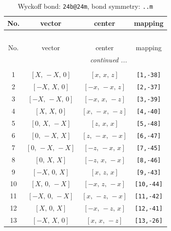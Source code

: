 \documentclass[fleqn,8pt]{jsarticle}
\begin{document}
\begin{longtable}{cccc}
\caption{Wyckoff bond: {\tt 24b@24m}, bond symmetry: {\tt ..m}}
 \\
 \hline \hline
No. & vector & center & mapping \\ \hline \endfirsthead

\multicolumn{3}{l}{\tablename\ \thetable{}} \\
 \hline \hline
No. & vector & center & mapping \\ \hline \endhead

 \hline \hline
\multicolumn{3}{r}{\footnotesize\it continued ...} \\ \endfoot

 \hline \hline
\multicolumn{3}{r}{} \\ \endlastfoot

1 & $\left[ X,\, - X,\, 0 \right]$ & $\left[ x,\, x,\, z \right]$ & {\tt [1,-38]} \\ \hline
2 & $\left[ - X,\, X,\, 0 \right]$ & $\left[ - x,\, - x,\, z \right]$ & {\tt [2,-37]} \\ \hline
3 & $\left[ - X,\, - X,\, 0 \right]$ & $\left[ - x,\, x,\, - z \right]$ & {\tt [3,-39]} \\ \hline
4 & $\left[ X,\, X,\, 0 \right]$ & $\left[ x,\, - x,\, - z \right]$ & {\tt [4,-40]} \\ \hline
5 & $\left[ 0,\, X,\, - X \right]$ & $\left[ z,\, x,\, x \right]$ & {\tt [5,-48]} \\ \hline
6 & $\left[ 0,\, - X,\, X \right]$ & $\left[ z,\, - x,\, - x \right]$ & {\tt [6,-47]} \\ \hline
7 & $\left[ 0,\, - X,\, - X \right]$ & $\left[ - z,\, - x,\, x \right]$ & {\tt [7,-45]} \\ \hline
8 & $\left[ 0,\, X,\, X \right]$ & $\left[ - z,\, x,\, - x \right]$ & {\tt [8,-46]} \\ \hline
9 & $\left[ - X,\, 0,\, X \right]$ & $\left[ x,\, z,\, x \right]$ & {\tt [9,-43]} \\ \hline
10 & $\left[ X,\, 0,\, - X \right]$ & $\left[ - x,\, z,\, - x \right]$ & {\tt [10,-44]} \\ \hline
11 & $\left[ - X,\, 0,\, - X \right]$ & $\left[ x,\, - z,\, - x \right]$ & {\tt [11,-42]} \\ \hline
12 & $\left[ X,\, 0,\, X \right]$ & $\left[ - x,\, - z,\, x \right]$ & {\tt [12,-41]} \\ \hline
13 & $\left[ - X,\, X,\, 0 \right]$ & $\left[ x,\, x,\, - z \right]$ & {\tt [13,-26]} \\ \hline

\end{longtable}
\end{document}
